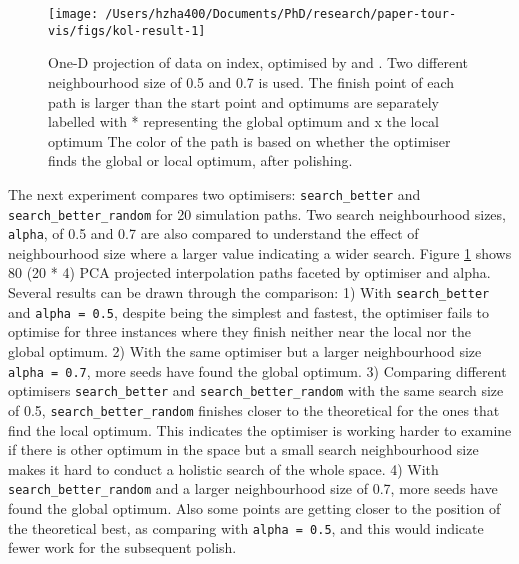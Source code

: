 \begin{Schunk}
\begin{figure}

{\centering \texttt{[image: /Users/hzha400/Documents/PhD/research/paper-tour-vis/figs/kol-result-1]} 

}

\caption[One-D projection of data  on  index,  optimised by  and ]{One-D projection of data  on  index,  optimised by  and . Two different neighbourhood size of 0.5 and 0.7 is used. The finish point of each path is larger than the start point and optimums are separately labelled with * representing the global optimum and x the local optimum The color of the path is based on whether the optimiser finds the global or local optimum, after polishing.}\label{fig:kol-result}
\end{figure}
\end{Schunk}

The next experiment compares two optimisers: \texttt{search\_better} and
\texttt{search\_better\_random} for 20 simulation paths. Two search
neighbourhood sizes, \texttt{alpha}, of 0.5 and 0.7 are also compared to
understand the effect of neighbourhood size where a larger value
indicating a wider search. Figure \ref{fig:kol-result} shows 80 (20 * 4)
PCA projected interpolation paths faceted by optimiser and alpha.
Several results can be drawn through the comparison: 1) With
\texttt{search\_better} and \texttt{alpha\ =\ 0.5}, despite being the
simplest and fastest, the optimiser fails to optimise for three
instances where they finish neither near the local nor the global
optimum. 2) With the same optimiser but a larger neighbourhood size
\texttt{alpha\ =\ 0.7}, more seeds have found the global optimum. 3)
Comparing different optimisers \texttt{search\_better} and
\texttt{search\_better\_random} with the same search size of 0.5,
\texttt{search\_better\_random} finishes closer to the theoretical for
the ones that find the local optimum. This indicates the optimiser is
working harder to examine if there is other optimum in the space but a
small search neighbourhood size makes it hard to conduct a holistic
search of the whole space. 4) With \texttt{search\_better\_random} and a
larger neighbourhood size of 0.7, more seeds have found the global
optimum. Also some points are getting closer to the position of the
theoretical best, as comparing with \texttt{alpha\ =\ 0.5}, and this
would indicate fewer work for the subsequent polish.

